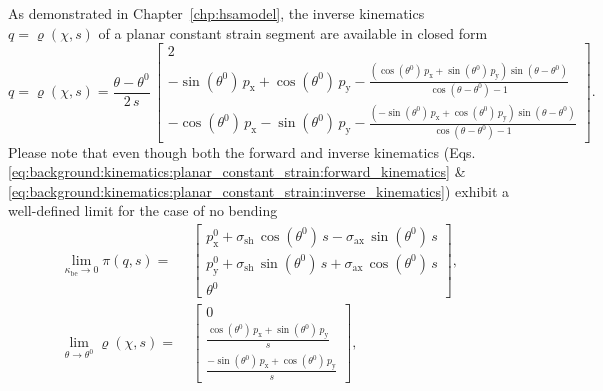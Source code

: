 As demonstrated in Chapter~\ref{chp:hsamodel}, the inverse kinematics $q = \varrho(\chi,s)$ of a planar constant strain segment are available in closed form
\begin{equation}\label{eq:background:kinematics:planar_constant_strain:inverse_kinematics}
    q = \varrho(\chi,s) = \frac{\theta-\theta^0}{2 \, s} \, \begin{bmatrix}
        2\\
        -\sin(\theta^0) \, p_\mathrm{x} + \cos(\theta^0) \, p_\mathrm{y} - \frac{\left (\cos(\theta^0) \, p_\mathrm{x} + \sin(\theta^0) \,  p_\mathrm{y} \right ) \sin(\theta-\theta^0)}{\cos(\theta-\theta^0)-1}\\
        -\cos(\theta^0) \, p_\mathrm{x} - \sin(\theta^0) \, p_\mathrm{y} - \frac{\left (-\sin(\theta^0) \, p_\mathrm{x} + \cos(\theta^0) \,  p_\mathrm{y} \right ) \sin(\theta-\theta^0)}{\cos(\theta-\theta^0)-1}
    \end{bmatrix}.
\end{equation}
Please note that even though both the forward and inverse kinematics (Eqs. \eqref{eq:background:kinematics:planar_constant_strain:forward_kinematics} \& \eqref{eq:background:kinematics:planar_constant_strain:inverse_kinematics}) exhibit a well-defined limit for the case of no bending
\begin{equation}
\begin{split}
    \lim_{\kappa_\mathrm{be} \to 0} \pi(q,s) =& \: \begin{bmatrix}
        p_\mathrm{x}^0 + \sigma_\mathrm{sh} \, \cos(\theta^0) \, s - \sigma_\mathrm{ax} \, \sin(\theta^0) \, s\\
        p_\mathrm{y}^0 + \sigma_\mathrm{sh} \, \sin(\theta^0) \, s + \sigma_\mathrm{ax} \, \cos(\theta^0) \, s\\
        \theta^0
    \end{bmatrix}, \\
    \lim_{\theta \to \theta^0} \varrho(\chi,s) =& \: \begin{bmatrix}
        0\\
        \frac{\cos(\theta^0) \, p_\mathrm{x} + \sin(\theta^0) \,  p_\mathrm{y}}{s}\\
        \frac{-\sin(\theta^0) \, p_\mathrm{x} + \cos(\theta^0) \,  p_\mathrm{y}}{s}
    \end{bmatrix},\\
\end{split}
\end{equation}
